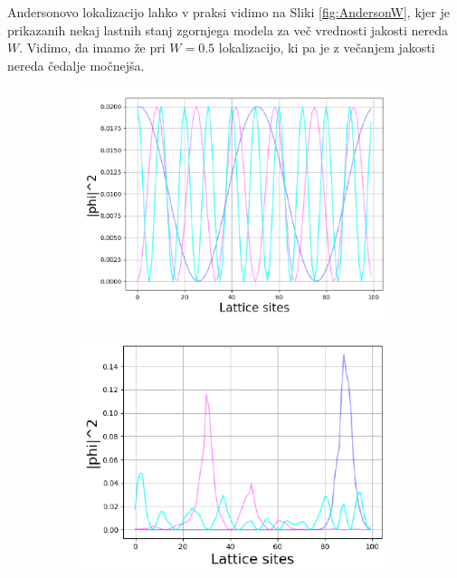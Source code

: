Andersonovo lokalizacijo lahko v praksi vidimo na Sliki \ref{fig:AndersonW}, kjer je prikazanih nekaj lastnih stanj zgornjega modela za več vrednosti jakosti nereda $W$. Vidimo, da imamo že pri $W=0.5$ lokalizacijo, ki pa je z večanjem jakosti nereda čedalje močnejša.
\begin{figure}[H]
\centering
\begin{subfigure}{.33\textwidth}
\includegraphics[width=\linewidth]{Figures/AndersonBloch.pdf}
\end{subfigure}
\begin{subfigure}{.32\textwidth}
\includegraphics[width=\linewidth]{Figures/Anderson05.pdf}
\end{subfigure}
\begin{subfigure}{.33\textwidth}

\end{subfigure}
\end{figure}
